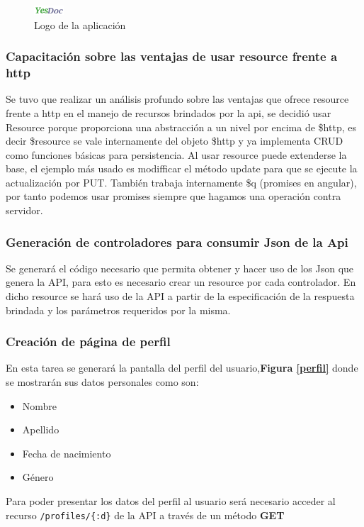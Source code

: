 	\begin{figure}[h]
        \centering
        \includegraphics[width=0.1\textwidth]{img/tp1_parte2/2-logoYesDoc}
        \caption{Logo de la aplicación}
		\label{logoYesDoc}
    \end{figure}

\subsubsection{ Capacitación sobre las ventajas de usar resource frente a http}

Se tuvo que realizar un análisis profundo sobre las ventajas que ofrece resource frente a http en el manejo de recursos brindados por la api, se decidió usar Resource porque proporciona una abstracción a un nivel por encima de \$http, es decir \$resource se vale internamente del objeto \$http y ya implementa CRUD como funciones básicas para persistencia. Al usar resource puede extenderse la base, el ejemplo más usado es modifficar el método update para que se ejecute la actualización por PUT. También trabaja internamente \$q (promises en angular), por tanto podemos usar promises siempre que hagamos una operación contra servidor.

\subsubsection{ Generación de controladores para consumir Json de la Api}
Se generará el código necesario que permita obtener y hacer uso de los Json que genera la API, para esto es necesario crear un resource por cada controlador. En dicho resource se  hará uso de la API  a partir de la especificación de la respuesta brindada y los parámetros requeridos por la misma.

 
\subsubsection{Creación de página de perfil}
En esta tarea  se generará la pantalla del perfil del usuario,\textbf{Figura \ref{perfil}} donde se mostrarán sus datos personales como son:
      \begin{itemize}
	      \item Nombre
          \item Apellido
          \item Fecha de nacimiento
          \item Género
      \end{itemize}
      Para poder presentar los datos del perfil al usuario será necesario  acceder al recurso \texttt{/profiles/\{:d\}} de la API a través de un método 		\textbf{GET}
      
